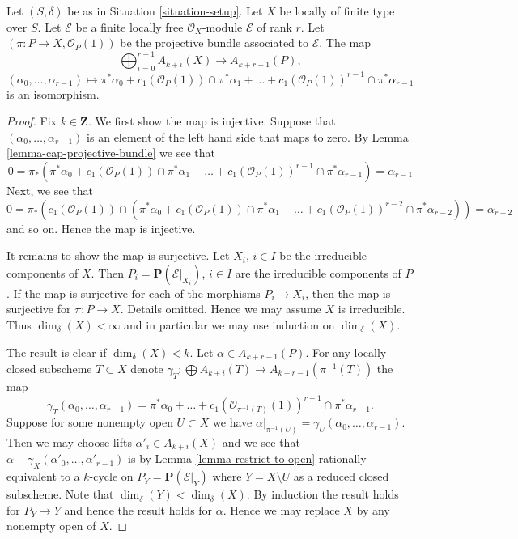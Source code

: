 \begin{lemma}
\label{lemma-chow-ring-projective-bundle}
Let $(S, \delta)$ be as in Situation \ref{situation-setup}.
Let $X$ be locally of finite type over $S$.
Let $\mathcal{E}$ be a finite locally free $\mathcal{O}_X$-module
$\mathcal{E}$ of rank $r$. Let $(\pi : P \to X, \mathcal{O}_P(1))$
be the projective bundle associated to $\mathcal{E}$.
The map
$$
\bigoplus\nolimits_{i = 0}^{r - 1}
A_{k + i}(X)
\longrightarrow
A_{k + r - 1}(P),
$$
$$
(\alpha_0, \ldots, \alpha_{r-1})
\longmapsto
\pi^*\alpha_0 +
c_1(\mathcal{O}_P(1)) \cap \pi^*\alpha_1
+ \ldots +
c_1(\mathcal{O}_P(1))^{r - 1} \cap \pi^*\alpha_{r-1}
$$
is an isomorphism.
\end{lemma}

\begin{proof}
Fix $k \in \mathbf{Z}$. We first show the map is injective.
Suppose that $(\alpha_0, \ldots, \alpha_{r - 1})$ is an element
of the left hand side that maps to zero.
By Lemma \ref{lemma-cap-projective-bundle} we see that
$$
0 = \pi_*(\pi^*\alpha_0 +
c_1(\mathcal{O}_P(1)) \cap \pi^*\alpha_1
+ \ldots +
c_1(\mathcal{O}_P(1))^{r - 1} \cap \pi^*\alpha_{r-1})
= \alpha_{r - 1}
$$
Next, we see that
$$
0 = \pi_*(c_1(\mathcal{O}_P(1)) \cap (\pi^*\alpha_0 +
c_1(\mathcal{O}_P(1)) \cap \pi^*\alpha_1
+ \ldots +
c_1(\mathcal{O}_P(1))^{r - 2} \cap \pi^*\alpha_{r - 2}))
= \alpha_{r - 2}
$$
and so on. Hence the map is injective.

\medskip\noindent
It remains to show the map is surjective.
Let $X_i$, $i \in I$ be the irreducible components of $X$.
Then $P_i = \mathbf{P}(\mathcal{E}|_{X_i})$, $i \in I$
are the irreducible components of $P$.
If the map is surjective for each of the morphisms
$P_i \to X_i$, then the map is
surjective for $\pi : P \to X$.
Details omitted. Hence we may assume $X$ is irreducible.
Thus $\dim_\delta(X) < \infty$ and in particular we may use
induction on $\dim_\delta(X)$.

\medskip\noindent
The result is clear if $\dim_\delta(X) < k$.
Let $\alpha \in A_{k + r - 1}(P)$.
For any locally closed subscheme $T \subset X$ denote
$\gamma_T : \bigoplus A_{k + i}(T) \to A_{k + r - 1}(\pi^{-1}(T))$
the map
$$
\gamma_T(\alpha_0, \ldots, \alpha_{r - 1})
= \pi^*\alpha_0 + \ldots +
c_1(\mathcal{O}_{\pi^{-1}(T)}(1))^{r - 1} \cap \pi^*\alpha_{r - 1}.
$$
Suppose for some nonempty open $U \subset X$ we have
$\alpha|_{\pi^{-1}(U)} = \gamma_U(\alpha_0, \ldots, \alpha_{r - 1})$.
Then we may choose lifts $\alpha'_i \in A_{k + i}(X)$ and we
see that $\alpha - \gamma_X(\alpha'_0, \ldots, \alpha'_{r - 1})$
is by Lemma \ref{lemma-restrict-to-open}
rationally equivalent to a $k$-cycle on $P_Y = \mathbf{P}(\mathcal{E}|_Y)$
where $Y = X \setminus U$ as a reduced closed subscheme.
Note that $\dim_\delta(Y) < \dim_\delta(X)$.
By induction the result holds
for $P_Y \to Y$ and hence the result holds for $\alpha$.
Hence we may replace $X$ by any nonempty open of $X$.


\end{proof}
